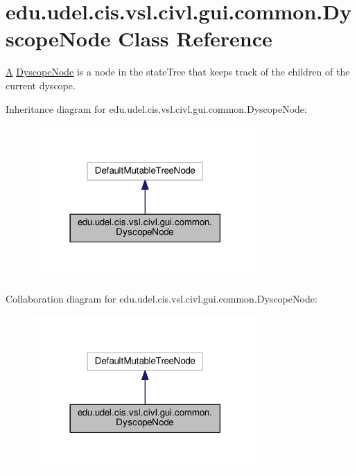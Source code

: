 \hypertarget{classedu_1_1udel_1_1cis_1_1vsl_1_1civl_1_1gui_1_1common_1_1DyscopeNode}{}\section{edu.\+udel.\+cis.\+vsl.\+civl.\+gui.\+common.\+Dyscope\+Node Class Reference}
\label{classedu_1_1udel_1_1cis_1_1vsl_1_1civl_1_1gui_1_1common_1_1DyscopeNode}


\hyperlink{structA}{A} \hyperlink{classedu_1_1udel_1_1cis_1_1vsl_1_1civl_1_1gui_1_1common_1_1DyscopeNode}{Dyscope\+Node} is a node in the state\+Tree that keeps track of the children of the current dyscope.  




Inheritance diagram for edu.\+udel.\+cis.\+vsl.\+civl.\+gui.\+common.\+Dyscope\+Node\+:
\nopagebreak
\begin{figure}[H]
\begin{center}
\leavevmode
\includegraphics[width=242pt]{classedu_1_1udel_1_1cis_1_1vsl_1_1civl_1_1gui_1_1common_1_1DyscopeNode__inherit__graph}
\end{center}
\end{figure}


Collaboration diagram for edu.\+udel.\+cis.\+vsl.\+civl.\+gui.\+common.\+Dyscope\+Node\+:
\nopagebreak
\begin{figure}[H]
\begin{center}
\leavevmode
\includegraphics[width=242pt]{classedu_1_1udel_1_1cis_1_1vsl_1_1civl_1_1gui_1_1common_1_1DyscopeNode__coll__graph}
\end{center}
\end{figure}
